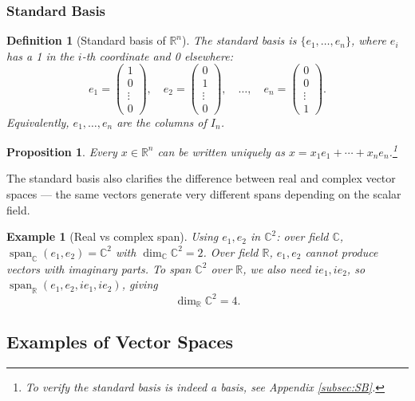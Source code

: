 \documentclass{article}
\newtheorem{definition}{Definition}
\newtheorem*{example}{Example}
\newtheorem{proposition}{Proposition}
\newcommand{\Span}{\operatorname{span}}
\begin{document}
\subsubsection{Standard Basis}
\begin{definition}[Standard basis of $\mathbb{R}^n$]
    The standard basis is $\{e_1,\ldots,e_n\}$, where $e_i$ has a 1 in the $i$-th coordinate and 0 elsewhere:
    \[e_1=\begin{pmatrix}1\\0\\\vdots\\0\end{pmatrix},\quad e_2=\begin{pmatrix}0\\1\\\vdots\\0\end{pmatrix},\quad\ldots,\quad e_n=\begin{pmatrix}0\\0\\\vdots\\1\end{pmatrix}.\]
    Equivalently, $e_1,\ldots,e_n$ are the columns of $I_n$.
\end{definition}
\begin{proposition}
    Every $x\in\mathbb{R}^n$ can be written uniquely as $x = x_1e_1+\cdots+x_ne_n$.\footnote{To verify the standard basis is indeed a basis, see Appendix \ref{subsec:SB}.}
\end{proposition}

The standard basis also clarifies the difference between real and complex vector spaces --- the same vectors generate very different spans depending on the scalar field.
\begin{example}[Real vs complex span]
    Using $e_1,e_2$ in $\mathbb{C}^2$: over field $\mathbb{C}$, $\Span_{\mathbb{C}}(e_1,e_2) = \mathbb{C}^2$ with $\dim_{\mathbb{C}}\mathbb{C}^2 = 2$. Over field $\mathbb{R}$, $e_1,e_2$ cannot produce vectors with imaginary parts. To span $\mathbb{C}^2$ over $\mathbb{R}$, we also need $ie_1, ie_2$, so $\Span_{\mathbb{R}}(e_1,e_2,ie_1,ie_2)$, giving
    \[\dim_{\mathbb{R}}\mathbb{C}^2 = 4.\]
\end{example}

\subsection{Examples of Vector Spaces}
\end{document}
